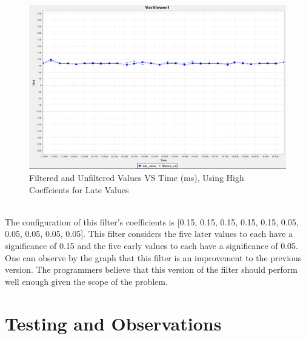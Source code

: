\documentclass[12pt]{report}
\begin{document}
\begin{figure}[h]
	\label{Linear Graph of the Filtered and Unfiltered Values Plotted Against Time}
	\begin{center}
		\includegraphics[scale=0.5]{./figures/adc_10coeffs_late_high_values.PNG}
		\caption{Filtered and Unfiltered Values VS Time (ms), Using High Coeffcients for Late Values}
	\end{center}
\end{figure}
\\The configuration of this filter's coefficients is [0.15, 0.15, 0.15, 0.15, 0.15, 0.05, 0.05, 0.05, 0.05, 0.05]. This filter considers the five later values to each have a significance of 0.15 and the five early values to each have a significance of 0.05. One can observe by the graph that this filter is an improvement to the previous version. The programmers believe that this version of the filter should perform well enough given the scope of the problem.

\section{Testing and Observations}
\end{document}
